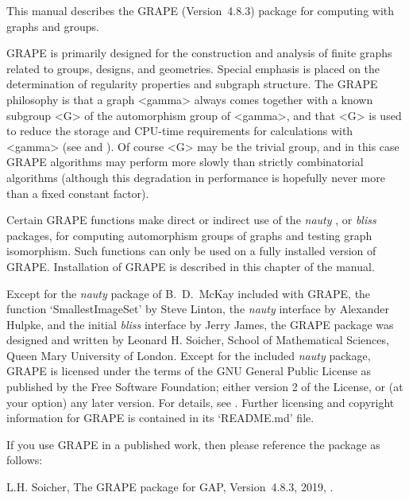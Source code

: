 %
%
%
%
\def\GRAPE{\sf GRAPE}
\def\DESIGN{\sf DESIGN}
\def\nauty{\it nauty}
\def\bliss{\it bliss}
\def\Aut{{\rm Aut}\,} 


This manual describes the {\GRAPE} (Version~4.8.3) package for computing
with graphs and groups.

{\GRAPE} is primarily designed for the construction and analysis of
finite graphs related to groups, designs, and geometries. Special
emphasis is placed on the determination of regularity properties and
subgraph structure. The {\GRAPE} philosophy is that a graph <gamma>
always comes together with a known subgroup <G> of the automorphism
group of <gamma>, and that <G> is used to reduce the storage and
CPU-time requirements for calculations with <gamma> (see
\cite{Soi93} and \cite{Soi04}).  Of course <G> may be the trivial group,
and in this case {\GRAPE} algorithms may perform more slowly than strictly
combinatorial algorithms (although this degradation in performance is
hopefully never more than a fixed constant factor).

Certain {\GRAPE} functions make direct or indirect use of the {\nauty}
\cite{Nau90}, \cite{MP14} or {\bliss} \cite{JK07} packages, for computing
automorphism groups of graphs and testing graph isomorphism. Such functions
can only be used on a fully installed version of {\GRAPE}. Installation
of {\GRAPE} is described in this chapter of the manual.

Except for the {\nauty} package of B.~D.~McKay included with {\GRAPE},
the function `SmallestImageSet' by Steve Linton, the {\nauty} interface
by Alexander Hulpke, and the initial {\bliss} interface by Jerry James,
the {\GRAPE} package was designed and written by Leonard H. Soicher,
School of Mathematical Sciences, Queen Mary University of London.
Except for the included {\nauty} package, {\GRAPE} is licensed under the
terms of the GNU General Public License as published by the Free Software
Foundation; either version 2 of the License, or (at your option) any later
version. For details, see .
Further licensing and copyright information for {\GRAPE} is contained
in its `README.md' file.

If you use {\GRAPE} in a published work, then please reference the
package as follows:

L.H. Soicher, The {GRAPE} package for {GAP}, Version~4.8.3, 2019,
.

